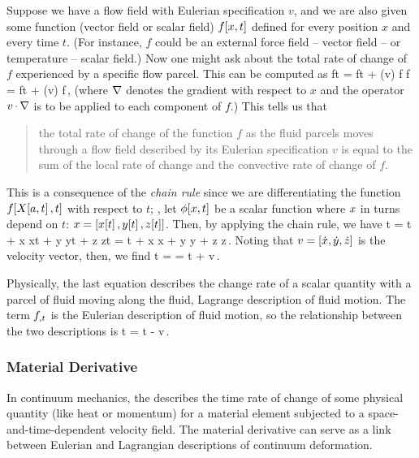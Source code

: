 Suppose we have a flow field with Eulerian specification $v$, and we are also given some function (vector field or scalar field) $f\!\left[{x,t}\right]$ defined for every position $x$ and every time $t$. (For instance, $f$ could be an external force field -- vector field -- or temperature -- scalar field.) Now one might ask about the total rate of change of $f$ experienced by a specific flow parcel. This can be computed as
\beq
\xmd ft = \xpd ft + (v\iprod\gder) f \implies \dt f = \cder ft + (v\iprod\gder) f\,,
\eeq
(where $\nabla$ denotes the gradient with respect to $x$ and the operator $v\operatorname{\cdot}\nabla$ is to be applied to each component of $f$.) This tells us that 
\begin{quote}
the total rate of change of the function $f$ as the fluid parcels moves through a flow field described by its Eulerian specification $v$ is equal to the sum of the local rate of change and the convective rate of change of $f$. 
\end{quote}
This is a consequence of the \emph{chain rule} since we are differentiating the function $f\!\left[{X\!\left[{a,t}\right],t}\right]$ with respect to $t$; \viz, let $\phi\!\left[{x, t}\right]$ be a scalar function where $x$ in turns depend on $t$: $x = \left[{x\!\left[{t}\right], y\!\left[{t}\right], z\!\left[{t}\right]}\right]$. Then, by applying the chain rule, we have
\beq
\xmd \phi t = \xpd \phi t + \xpd \phi x \xod xt + \xpd \phi y \xod yt + \xpd \phi z \xod zt
            = \cder \phi t + \dt x \cder \phi x + \dt y \cder \phi y + \dt z \cder \phi z\,.
\eeq
Noting that $v = \left[{\dot{x}, \dot{y}, \dot{z}}\right]$ is the velocity vector, then, we find
\beq
\mder\phi t = \dt\phi = \cder \phi t + v\iprod\gder \phi\,.\mqed
\eeq

Physically, the last equation describes the change rate of a scalar quantity with a parcel of fluid moving along the fluid, Lagrange description of fluid motion. The term ${f}_{,{t}}$ is the Eulerian description of fluid motion, so the relationship between the two descriptions is
\beq
\cder\phi t = \mder\phi t - v\iprod\gder\phi \,.\mqed
\eeq


\subsubsection{Material Derivative}
In continuum mechanics, the  describes the time rate of change of some physical quantity (like heat or momentum) for a material element subjected to a space-and-time-dependent velocity field. The material derivative can serve as a link between Eulerian and Lagrangian descriptions of continuum deformation.


